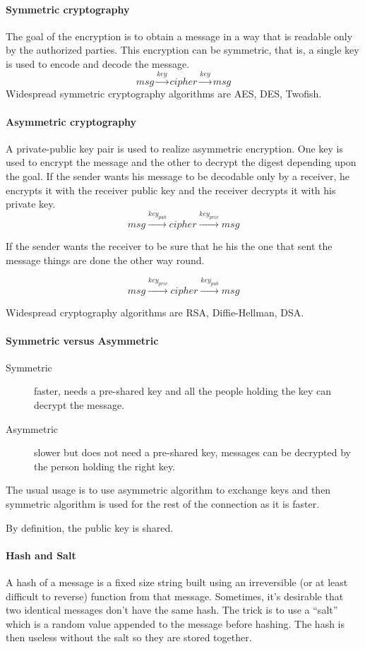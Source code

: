 \paragraph{Symmetric cryptography}
The goal of the encryption is to obtain a message in a way that is readable
only by the authorized parties.
This encryption can be symmetric, that is, a single key is used to encode and
decode the message.
\[ msg \xrightarrow{key} cipher \xrightarrow{key} msg \]
Widespread symmetric cryptography algorithms are AES, DES, Twofish.

\paragraph{Asymmetric cryptography}
A private-public key pair is used to realize asymmetric
encryption. One key is used to encrypt the message and the other to
decrypt the digest depending upon the goal. If the sender wants his
message to be decodable only by a receiver, he encrypts it with the
receiver public key and the receiver decrypts it with his private key.
\[ msg \xrightarrow{key_{pub}} cipher \xrightarrow{key_{priv}} msg \]

If the sender wants the receiver to be sure that he his the one that
sent the message things are done the other way round.

\[ msg \xrightarrow{key_{priv}} cipher \xrightarrow{key_{pub}} msg \]

Widespread cryptography algorithms are RSA, Diffie-Hellman, DSA.

\paragraph{Symmetric versus Asymmetric}

\begin{description}
\item[Symmetric]
faster, needs a pre-shared key and all the people holding the key can
decrypt the message.
\item[Asymmetric]
slower but does not need a pre-shared key, messages can be decrypted by the
person holding the right key.
\end{description}

The usual usage is to use asymmetric algorithm to exchange keys and then
symmetric algorithm is used for the rest of the connection as it is faster.

By definition, the public key is shared.

\paragraph{Hash and Salt}
A hash of a message is a fixed size string built using an irreversible
(or at least difficult to reverse) function from that
message. Sometimes, it's desirable that two identical messages don't
have the same hash. The trick is to use a ``salt'' which is a random
value appended to the message before hashing. The hash is then useless
without the salt so they are stored together.

